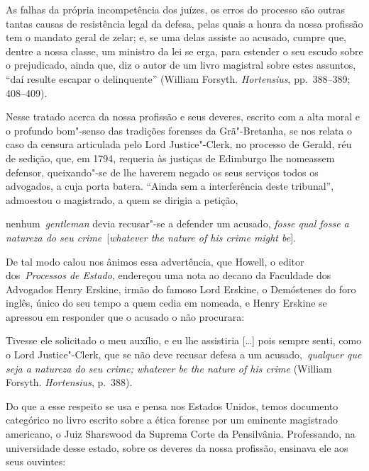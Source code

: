 As falhas da própria incompetência
dos juízes, os erros do processo são outras tantas causas de
resistência legal da defesa, pelas quais a honra da nossa profissão tem
o mandato geral de zelar; e, se uma delas assiste ao acusado, cumpre
que, dentre a nossa classe, um ministro da lei se erga, para estender o
seu escudo sobre o prejudicado, ainda que, diz o autor de um livro
magistral sobre estes assuntos, “daí resulte escapar o delinquente”
(William Forsyth. \textit{Hortensius}, pp.~388--389; 408--409). 

Nesse tratado acerca da nossa profissão e seus deveres, escrito com a alta moral e o
profundo bom"-senso das tradições forenses da Grã"-Bretanha, se nos
relata o caso da censura articulada pelo Lord Justice"-Clerk, no
processo de Gerald, réu de sedição, que, em 1794, requeria às justiças
de Edimburgo lhe nomeassem defensor, queixando"-se de lhe haverem
negado os seus serviços todos os advogados, a cuja porta batera.
“Ainda sem a interferência deste tribunal”, admoestou o magistrado, a
quem se dirigia a petição, 

\begin{hedraquote}
nenhum \textit{gentleman} devia recusar"-se a
defender um acusado, \textit{fosse qual fosse a natureza do
seu crime} [\textit{whatever the nature of his crime might be}].
\end{hedraquote}

 De tal modo calou nos ânimos essa advertência, que Howell, o
editor dos \textit{Processos de Estado}, endereçou uma nota ao decano
da Faculdade dos Advogados Henry Erskine, irmão do famoso Lord Erskine,
o Demóstenes do foro inglês, único do seu tempo a quem cedia em
nomeada, e Henry Erskine se apressou em responder que o acusado o não
procurara: 

\begin{hedraquote}
Tivesse ele solicitado o meu auxílio, e eu lhe assistiria
[\ldots{}] pois sempre senti, como o Lord Justice"-Clerk, que se não deve
recusar defesa a um acusado, \textit{qualquer que seja a natureza do}
\textit{seu crime}\textit{; whatever be the nature of his
crime} (William Forsyth. \textit{Hortensius}, p.~388). 
\end{hedraquote}

Do que a esse respeito se usa e pensa nos Estados Unidos, temos documento categórico
no livro escrito sobre a ética forense por um eminente magistrado
americano, o Juiz Sharswood da Suprema Corte da Pensilvânia.
Professando, na universidade desse estado, sobre os deveres da nossa
profissão, ensinava ele aos seus ouvintes: 

